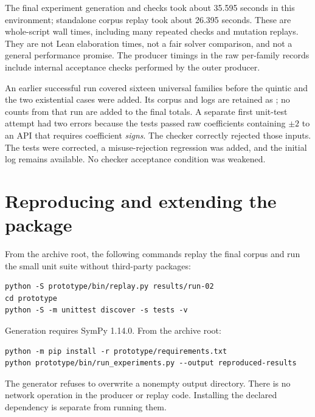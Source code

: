 The final experiment generation and checks took about 35.595 seconds in this environment; standalone corpus replay took about 26.395 seconds. These are whole-script wall times, including many repeated checks and mutation replays. They are not Lean elaboration times, not a fair solver comparison, and not a general performance promise. The producer timings in the raw per-family records include internal acceptance checks performed by the outer producer.

An earlier successful run covered sixteen universal families before the quintic and the two existential cases were added. Its corpus and logs are retained as ; no counts from that run are added to the final totals. A separate first unit-test attempt had two errors because the tests passed raw coefficients containing $\pm2$ to an API that requires coefficient \emph{signs}. The checker correctly rejected those inputs. The tests were corrected, a misuse-rejection regression was added, and the initial log remains available. No checker acceptance condition was weakened.

\section{Reproducing and extending the package}\label{sec:reproduce}

From the archive root, the following commands replay the final corpus and run the small unit suite without third-party packages:
\begin{lstlisting}
python -S prototype/bin/replay.py results/run-02
cd prototype
python -S -m unittest discover -s tests -v
\end{lstlisting}
Generation requires SymPy 1.14.0. From the archive root:
\begin{lstlisting}
python -m pip install -r prototype/requirements.txt
python prototype/bin/run_experiments.py --output reproduced-results
\end{lstlisting}
The generator refuses to overwrite a nonempty output directory. There is no network operation in the producer or replay code. Installing the declared dependency is separate from running them.

